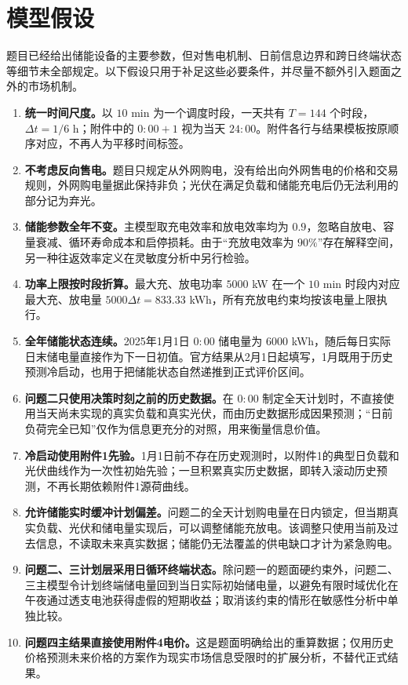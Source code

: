 \section{模型假设}

题目已经给出储能设备的主要参数，但对售电机制、日前信息边界和跨日终端状态等细节未全部规定。以下假设只用于补足这些必要条件，并尽量不额外引入题面之外的市场机制。
\begin{enumerate}[label=\arabic*., itemsep=2pt, topsep=3pt]
    \item \textbf{统一时间尺度。}以 $10$ min 为一个调度时段，一天共有 $T=144$ 个时段，$\Delta t=1/6$ h；附件中的 $0{:}00{+}1$ 视为当天 $24{:}00$。附件各行与结果模板按原顺序对应，不再人为平移时间标签。
    \item \textbf{不考虑反向售电。}题目只规定从外网购电，没有给出向外网售电的价格和交易规则，外网购电量据此保持非负；光伏在满足负载和储能充电后仍无法利用的部分记为弃光。
    \item \textbf{储能参数全年不变。}主模型取充电效率和放电效率均为 $0.9$，忽略自放电、容量衰减、循环寿命成本和启停损耗。由于“充放电效率为 $90\%$”存在解释空间，另一种往返效率定义在灵敏度分析中另行检验。
    \item \textbf{功率上限按时段折算。}最大充、放电功率 $5000$ kW 在一个 $10$ min 时段内对应最大充、放电量 $5000\Delta t=833.33$ kWh，所有充放电约束均按该电量上限执行。
    \item \textbf{全年储能状态连续。}2025年1月1日 $0{:}00$ 储电量为 $6000$ kWh，随后每日实际日末储电量直接作为下一日初值。官方结果从2月1日起填写，1月既用于历史预测冷启动，也用于把储能状态自然递推到正式评价区间。
    \item \textbf{问题二只使用决策时刻之前的历史数据。}在 $0{:}00$ 制定全天计划时，不直接使用当天尚未实现的真实负载和真实光伏，而由历史数据形成因果预测；“日前负荷完全已知”仅作为信息更充分的对照，用来衡量信息价值。
    \item \textbf{冷启动使用附件1先验。}1月1日前不存在历史观测时，以附件1的典型日负载和光伏曲线作为一次性初始先验；一旦积累真实历史数据，即转入滚动历史预测，不再长期依赖附件1源荷曲线。
    \item \textbf{允许储能实时缓冲计划偏差。}问题二的全天计划购电量在日内锁定，但当期真实负载、光伏和储电量实现后，可以调整储能充放电。该调整只使用当前及过去信息，不读取未来真实数据；储能仍无法覆盖的供电缺口才计为紧急购电。
    \item \textbf{问题二、三计划层采用日循环终端状态。}除问题一的题面硬约束外，问题二、三主模型令计划终端储电量回到当日实际初始储电量，以避免有限时域优化在午夜通过透支电池获得虚假的短期收益；取消该约束的情形在敏感性分析中单独比较。
    \item \textbf{问题四主结果直接使用附件4电价。}这是题面明确给出的重算数据；仅用历史价格预测未来价格的方案作为现实市场信息受限时的扩展分析，不替代正式结果。
\end{enumerate}

